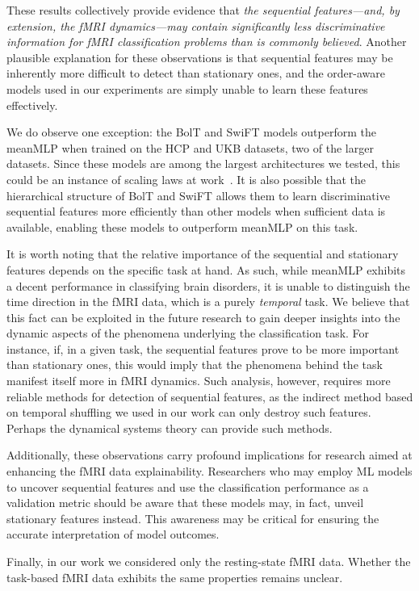 \documentclass[final,5p,times,twocolumn,authoryear]{elsarticle}
\begin{document}
These results collectively provide evidence that \emph{the sequential features---and, by extension, the fMRI dynamics---may contain significantly less discriminative information for fMRI classification problems than is commonly believed}. Another plausible explanation for these observations is that sequential features may be inherently more difficult to detect than stationary ones, and the order-aware models used in our experiments are simply unable to learn these features effectively.

We do observe one exception: the BolT and SwiFT models outperform the meanMLP when trained on the HCP and UKB datasets, two of the larger datasets. Since these models are among the largest architectures we tested, this could be an instance of scaling laws at work~\citep{abrol2021deep}. It is also possible that the hierarchical structure of BolT and SwiFT allows them to learn discriminative sequential features more efficiently than other models when sufficient data is available, enabling these models to outperform meanMLP on this task.

It is worth noting that the relative importance of the sequential and stationary features depends on the specific task at hand. As such, while meanMLP exhibits a decent performance in classifying brain disorders, it is unable to distinguish the time direction in the fMRI data, which is a purely \emph{temporal} task. We believe that this fact can be exploited in the future research to gain deeper insights into the dynamic aspects of the phenomena underlying the classification task. For instance, if, in a given task, the sequential features prove to be more important than stationary ones, this would imply that the phenomena behind the task manifest itself more in fMRI dynamics. Such analysis, however, requires more reliable methods for detection of sequential features, as the indirect method based on temporal shuffling we used in our work can only destroy such features. Perhaps the dynamical systems theory \citep{dst} can provide such methods.

Additionally, these observations carry profound implications for research aimed at enhancing the fMRI data explainability. Researchers who may employ ML models to uncover sequential features and use the classification performance as a validation metric should be aware that these models may, in fact, unveil stationary features instead. This awareness may be critical for ensuring the accurate interpretation of model outcomes.

Finally, in our work we considered only the resting-state fMRI data. Whether the task-based fMRI data exhibits the same properties remains unclear.
\end{document}
